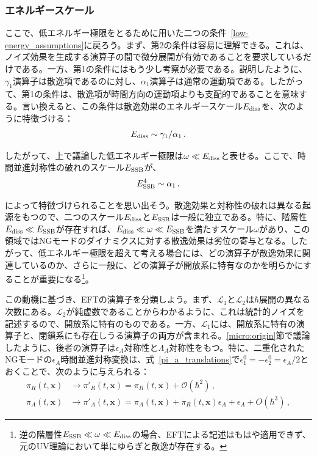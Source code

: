 \subsubsection{エネルギースケール}

ここで、低エネルギー極限をとるために用いた二つの条件~\eqref{low-energy_assumptions}に戻ろう。まず、第2の条件は容易に理解できる。これは、ノイズ効果を生成する演算子の間で微分展開が有効であることを要求しているだけである。一方、第1の条件にはもう少し考察が必要である。説明したように、$\gamma_1$演算子は散逸項であるのに対し、$\alpha_1$演算子は通常の運動項である。したがって、第1の条件は、散逸項が時間方向の運動項よりも支配的であることを意味する。言い換えると、この条件は散逸効果のエネルギースケール$E_{\rm diss}$を、次のように特徴づける：
\begin{align}
E_{\rm diss}\sim\gamma_1/\alpha_1\,.
\end{align}

したがって、上で議論した低エネルギー極限は$\omega\ll E_{\rm diss}$と表せる。ここで、時間並進対称性の破れのスケール$E_{\rm SSB}$が、
\begin{align}
E_{\rm SSB}^4\sim \alpha_1\,.
\end{align}

によって特徴づけられることを思い出そう。散逸効果と対称性の破れは異なる起源をもつので、二つのスケール$E_{\rm diss}$と$E_{\rm SSB}$は一般に独立である。特に、階層性$E_{\rm diss}\ll E_{\rm SSB}$が存在すれば、$E_{\rm diss}\ll \omega\ll E_{\rm SSB}$を満たすスケール$\omega$があり、この領域ではNGモードのダイナミクスに対する散逸効果は劣位の寄与となる。したがって、低エネルギー極限を超えて考える場合には、どの演算子が散逸効果に関連しているのか、さらに一般に、どの演算子が開放系に特有なのかを明らかにすることが重要になる\footnote{逆の階層性$E_{\rm SSB}\ll \omega\ll E_{\rm diss}$の場合、EFTによる記述はもはや適用できず、元のUV理論において単にゆらぎと散逸が存在する。}。

\medskip
この動機に基づき、EFTの演算子を分類しよう。まず、$\mathcal{L}_1$と$\mathcal{L}_2$は$\hbar$展開の異なる次数にある。$\mathcal{L}_2$が純虚数であることからわかるように、これは統計的ノイズを記述するので、開放系に特有のものである。一方、$\mathcal{L}_1$には、開放系に特有の演算子と、閉鎖系にも存在しうる演算子の両方が含まれる。\ref{micro:origin}節で議論したように、後者の演算子は$\epsilon_A$対称性と$\Lambda_A$対称性をもつ。特に、二重化されたNGモードの$\epsilon_A$時間並進対称変換は、式~\eqref{pi_a_translations}で$\epsilon^0_1=-\epsilon^0_2=\epsilon_A/2$とおくことで、次のように与えられる：
\begin{align}
\label{epsilon_A_R}
 \pi_R(t,\mathbf{x})&\to 
 \pi'_R(t,\mathbf{x}) 
 = \pi_R(t,\mathbf{x}) 
 +\mathcal{O}(\hbar^2)\,,
 \\
\label{epsilon_A_A}
 \pi_A(t,\mathbf{x})&\to 
 \pi'_A(t,\mathbf{x})
 =\pi_A(t,\mathbf{x})+\dot{\pi}_R(t,\mathbf{x})\epsilon_A+\epsilon_A+ O(\hbar^3)\,,
\end{align}

